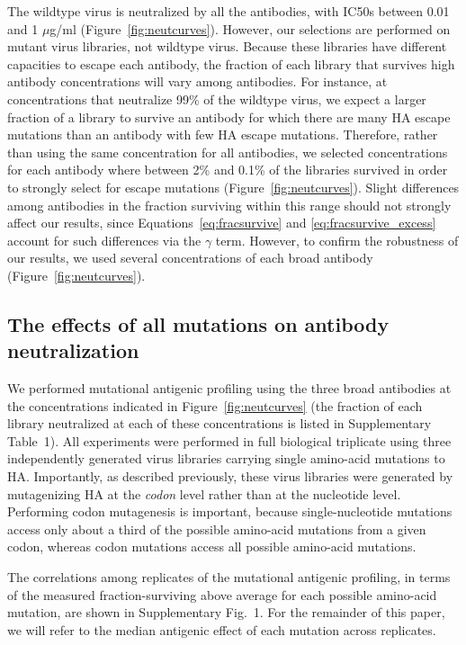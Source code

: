 \documentclass[11pt]{article}
\begin{document}
The wildtype virus is neutralized by all the antibodies, with IC50s between 0.01 and 1 $\mu$g/ml (Figure~\ref{fig:neutcurves}).
However, our selections are performed on mutant virus libraries, not wildtype virus.
Because these libraries have different capacities to escape each antibody, the fraction of each library that survives high antibody concentrations will vary among antibodies.
For instance, at concentrations that neutralize 99\% of the wildtype virus, we expect a larger fraction of a library to survive an antibody for which there are many HA escape mutations than an antibody with few HA escape mutations.
Therefore, rather than using the same concentration for all antibodies, we selected concentrations for each antibody where between 2\% and 0.1\% of the libraries survived in order to strongly select for escape mutations (Figure~\ref{fig:neutcurves}).
Slight differences among antibodies in the fraction surviving within this range should not strongly affect our results, since Equations~\ref{eq:fracsurvive} and \ref{eq:fracsurvive_excess} account for such differences via the $\gamma$ term.
However, to confirm the robustness of our results, we used several concentrations of each broad antibody (Figure~\ref{fig:neutcurves}).

\subsection*{The effects of all mutations on antibody neutralization}
We performed mutational antigenic profiling using the three broad antibodies at the concentrations indicated in Figure~\ref{fig:neutcurves} (the fraction of each library neutralized at each of these concentrations is listed in Supplementary Table~1). 
All experiments were performed in full biological triplicate using three independently generated virus libraries carrying single amino-acid mutations to HA\cite{doud2016accurate}.
Importantly, as described previously\cite{doud2016accurate}, these virus libraries were generated by mutagenizing HA at the \emph{codon} level rather than at the nucleotide level.
Performing codon mutagenesis is important, because single-nucleotide mutations access only about a third of the possible amino-acid mutations from a given codon, whereas codon mutations access all possible amino-acid mutations.

The correlations among replicates of the mutational antigenic profiling, in terms of the measured fraction-surviving above average for each possible amino-acid mutation, are shown in Supplementary Fig.~1.
For the remainder of this paper, we will refer to the median antigenic effect of each mutation across replicates.
\end{document}
